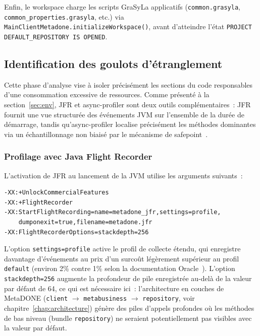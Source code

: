 Enfin, le workspace charge les scripts GraSyLa applicatifs (\texttt{common.grasyla}, \texttt{common\_properties.grasyla}, etc.) via
\texttt{MainClientMetadone.initializeWorkspace()}, avant d'atteindre l'état
\texttt{PROJECT DEFAULT\_REPOSITORY IS OPENED}.

\subsection{Identification des goulots d'étranglement}
\label{sec:scenario1-profil1}

Cette phase d'analyse vise à isoler précisément les sections du code
responsables d'une consommation excessive de ressources. Comme présenté à
la section~\ref{sec:env}, JFR et async-profiler sont deux outils
complémentaires~: JFR fournit une vue structurée des événements JVM sur
l'ensemble de la durée de démarrage, tandis qu'async-profiler localise
précisément les méthodes dominantes via un échantillonnage non biaisé par
le mécanisme de safepoint~\cite{mytkowicz2010evaluating}.

\subsubsection{Profilage avec Java Flight Recorder}

L'activation de JFR au lancement de la JVM utilise les arguments suivants~:

\begin{verbatim}
-XX:+UnlockCommercialFeatures
-XX:+FlightRecorder
-XX:StartFlightRecording=name=metadone_jfr,settings=profile,
    dumponexit=true,filename=metadone.jfr
-XX:FlightRecorderOptions=stackdepth=256
\end{verbatim}

L'option \texttt{settings=profile} active le profil de collecte étendu,
qui enregistre davantage d'événements au prix d'un surcoût légèrement
supérieur au profil \texttt{default} (environ 2\% contre 1\% selon la
documentation Oracle~\cite{jfr2021oracle}). L'option \texttt{stackdepth=256} augmente la profondeur de pile enregistrée au-delà de la valeur par défaut de 64, ce qui est nécessaire ici~: l'architecture en couches de MetaDONE (\texttt{client} $\to$ \texttt{metabusiness} $\to$ \texttt{repository}, voir chapitre~\ref{chap:architecture}) génère des piles d'appels profondes où les méthodes de bas niveau (bundle \texttt{repository}) ne seraient potentiellement pas visibles avec la valeur par défaut.


